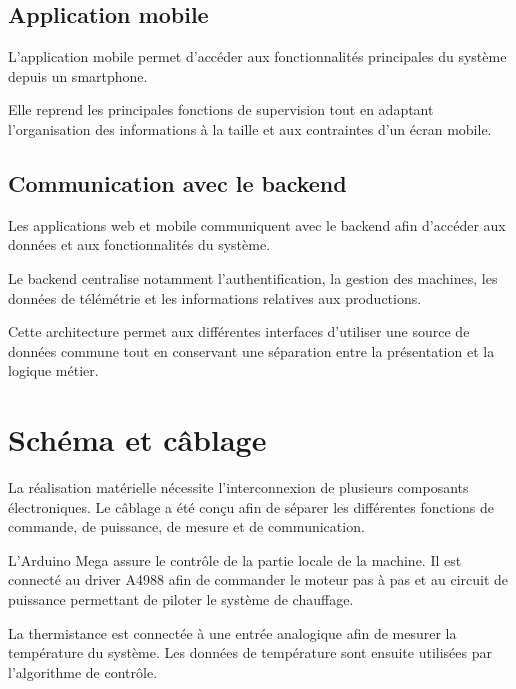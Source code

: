 \subsection{Application mobile}

L'application mobile permet d'accéder aux fonctionnalités principales du
système depuis un smartphone.

Elle reprend les principales fonctions de supervision tout en adaptant
l'organisation des informations à la taille et aux contraintes d'un
écran mobile.

%

\subsection{Communication avec le backend}

Les applications web et mobile communiquent avec le backend afin
d'accéder aux données et aux fonctionnalités du système.

Le backend centralise notamment l'authentification, la gestion des
machines, les données de télémétrie et les informations relatives aux
productions.

Cette architecture permet aux différentes interfaces d'utiliser une
source de données commune tout en conservant une séparation entre la
présentation et la logique métier.

\section{Schéma et câblage}

La réalisation matérielle nécessite l'interconnexion de plusieurs
composants électroniques. Le câblage a été conçu afin de séparer les
différentes fonctions de commande, de puissance, de mesure et de
communication.

L'Arduino Mega assure le contrôle de la partie locale de la machine. Il
est connecté au driver A4988 afin de commander le moteur pas à pas et au
circuit de puissance permettant de piloter le système de chauffage.

La thermistance est connectée à une entrée analogique afin de mesurer la
température du système. Les données de température sont ensuite utilisées
par l'algorithme de contrôle.

